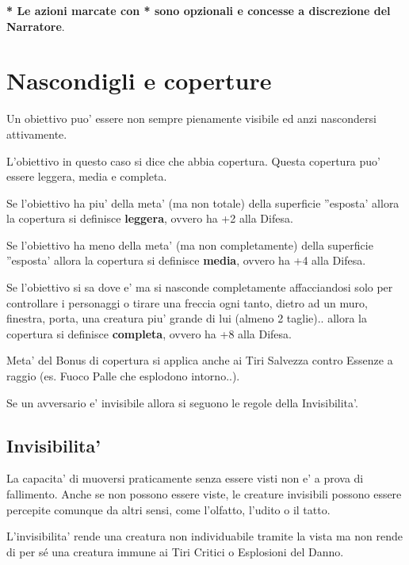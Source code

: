 \documentclass[a4paper,11pt,twoside,openany]{book}
\begin{document}
	\bigskip
	
	\textbf{{*} Le azioni marcate con {*} sono opzionali e concesse a
		discrezione del Narratore}.
	
	\pagebreak
	
	\section{Nascondigli e coperture}
	
	\label{nascondigli-e-coperture}
	Un obiettivo puo' essere non sempre pienamente visibile ed anzi nascondersi
	attivamente.
	
	L'obiettivo in questo caso si dice che abbia copertura. Questa copertura puo' essere leggera, media e completa.
	
	Se l'obiettivo ha piu' della meta' (ma non totale) della superficie ''esposta' allora la copertura si definisce \textbf{leggera}, ovvero ha +2 alla Difesa.
	
	Se l'obiettivo ha meno della meta' (ma non completamente) della superficie ''esposta' allora la copertura si definisce \textbf{media}, ovvero ha +4 alla Difesa.
	
	Se l'obiettivo si sa dove e' ma si nasconde completamente affacciandosi solo per controllare i personaggi o tirare una freccia ogni tanto, dietro ad un muro, finestra, porta, una creatura piu' grande di lui (almeno 2 taglie).. allora la copertura si definisce \textbf{completa}, ovvero ha +8 alla Difesa.
	
	Meta' del Bonus di copertura si applica anche ai Tiri Salvezza contro
	Essenze a raggio (es. Fuoco Palle che esplodono intorno..).
	
	Se un avversario e' invisibile allora si seguono le regole della Invisibilita'.
	
	\subsection{Invisibilita'}
	
	\label{invisibilita}
	
	La capacita' di muoversi praticamente senza essere visti non e' a prova di fallimento. Anche se non possono essere viste, le creature invisibili possono essere percepite comunque da altri sensi, come l'olfatto, l'udito o il tatto.
	
	L'invisibilita' rende una creatura non individuabile tramite la vista ma non rende di per sé una creatura immune ai Tiri Critici o Esplosioni del Danno.
	
\end{document}
